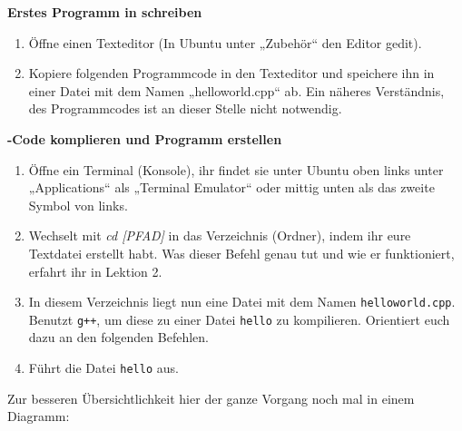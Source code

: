 \begin{praxis}

    \textbf{Erstes Programm in \Cpp schreiben}

    \begin{enumerate}
        \item Öffne einen Texteditor (In Ubuntu unter „Zubehör“ den Editor gedit).
        
        \item Kopiere folgenden Programmcode in den Texteditor und speichere ihn in einer Datei mit dem Namen „helloworld.cpp“ ab. 
        Ein näheres Verständnis, des Programmcodes ist an dieser Stelle nicht notwendig. 
    \end{enumerate}    


    \textbf{\Cpp-Code komplieren und Programm erstellen }
  
    \begin{enumerate}
        \item Öffne ein Terminal (Konsole), ihr findet sie unter Ubuntu oben links unter „Applications“ als „Terminal Emulator“ oder mittig unten als das zweite Symbol von links.
        \item Wechselt mit \textit{cd [PFAD]} in das Verzeichnis (Ordner), indem ihr eure Textdatei erstellt habt. Was dieser Befehl genau tut und wie er funktioniert, erfahrt ihr in Lektion 2.
        \item In diesem Verzeichnis liegt nun eine Datei mit dem Namen \texttt{helloworld.cpp}.
              Benutzt \texttt{g++}, um diese zu einer Datei \texttt{hello} zu
              kompilieren. Orientiert euch dazu an den folgenden Befehlen. 
        \item Führt die Datei \texttt{hello} aus.
    \end{enumerate}
\end{praxis}


Zur besseren Übersichtlichkeit hier der ganze Vorgang noch mal in einem
Diagramm:

\begin{center}
\end{center}


